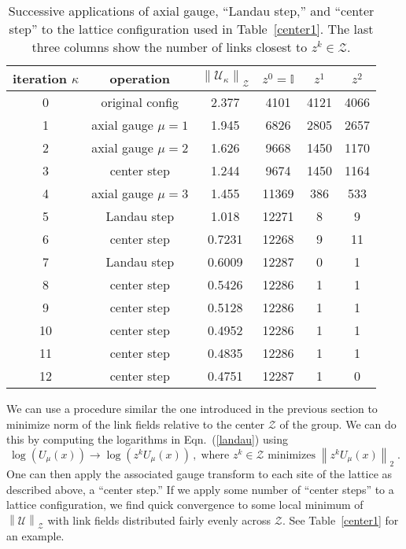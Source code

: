 \documentclass[preprint,aps,prd]{revtex4-2}
\newcommand{\be}{\begin{equation}}
\newcommand{\eq}{\end{equation}}
\newcommand{\zentrum}{\mathcal{Z}}       %
\newcommand{\config}{\mathcal{U}}
\begin{document}
\begin{table}
  \caption{Successive applications of axial gauge,
    ``Landau step,'' and ``center step'' to the lattice configuration
    used in Table~\ref{center1}.
    The last three columns show the number of links closest
    to $z^k \in \zentrum$.
    \label{center4}}
  \begin{tabular}{c|c|c|ccc}
    iteration $\kappa$ & operation & $\left\lVert \config_\kappa \right\rVert_\zentrum$
     & $z^0=\mathbb{I}$ & $z^1$ & $z^2$ \\
    \hline
    0 & original config    & 2.377  & 4101 & 4121 & 4066\\
    1 & axial gauge $\mu=1$& 1.945  & 6826 & 2805 & 2657\\
    2 & axial gauge $\mu=2$& 1.626  & 9668 & 1450 & 1170\\
    3 & center step        & 1.244  & 9674 & 1450 & 1164\\
    4 & axial gauge $\mu=3$& 1.455  & 11369 & 386 & 533\\
    5 & Landau step        & 1.018  & 12271 &   8 &   9\\
    6 & center step        & 0.7231 & 12268 &   9 &  11\\
    7 & Landau step        & 0.6009 & 12287 &   0 &   1\\
    8 & center step        & 0.5426 & 12286 &   1 &   1\\
    9 & center step        & 0.5128 & 12286 &   1 &   1\\
    10 & center step       & 0.4952 & 12286 &   1 &   1\\
    11 & center step       & 0.4835 & 12286 &   1 &   1\\
    12 & center step       & 0.4751 & 12287 &   1 &   0\\
  \end{tabular}
  \end{table}

We can use a procedure similar the one introduced
in the previous section to minimize norm of the link fields
relative to the center $\zentrum$ of the group.
We can do this by computing the logarithms in Eqn.~(\ref{landau})
using
\be
\log\left(U_\mu(x)\right) \to \log\left(z^k U_\mu(x)\right)
\, , \;\mbox{
  where $z^k\in\zentrum$ minimizes}\; \left\lVert z^k U_\mu(x) \right\rVert_2 \;.
\eq
One can then apply the associated gauge transform to each site of
the lattice as described above, a ``center step.''
If we apply some number of ``center steps'' to a lattice
configuration, we find quick convergence to some local
minimum of $\left\lVert \config \right\rVert_\zentrum$ with
link fields distributed fairly evenly across $\zentrum$.
See Table~\ref{center1} for an example.
\end{document}
